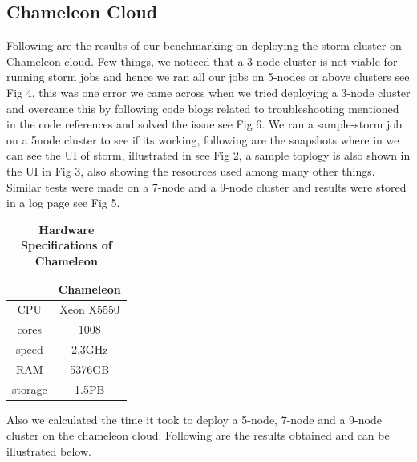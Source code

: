 \documentclass[9pt,twocolumn,twoside]{../../styles/osajnl}
\begin{document}
\subsection{Chameleon Cloud}
Following are the results of our benchmarking on deploying the storm
cluster on Chameleon cloud. Few things, we noticed that a 3-node
cluster is not viable for running storm jobs and hence we ran all our
jobs on 5-nodes or above clusters see Fig 4, this was one error we
came across when we tried deploying a 3-node cluster and overcame this
by following code blogs related to troubleshooting mentioned in the
code references and solved the issue see Fig 6. We ran a sample-storm job on a
5node cluster to see if its working, following are the snapshots where
in we can see the UI of storm, illustrated in see Fig 2, a sample
toplogy is also shown in the UI in Fig 3, also showing the resources
used among many other things. Similar tests were made on a 7-node and
a 9-node cluster and results were stored in a log page see Fig 5.



\begin{table}[htbp]
\centering
\caption{\bf Hardware Specifications of Chameleon}

 \begin{tabular} {| c | c |}
\hline
  & Chameleon   \\ [0.5ex] 
 \hline

    
CPU   & Xeon X5550  \\
 \hline
cores & 1008   \\
 \hline
speed & 2.3GHz \\
 \hline
RAM   & 5376GB  \\
 \hline
storage & 1.5PB  \\ [1ex] 
 \hline

\end{tabular}
  \label{tab:cloud-comparison}
\end{table}



Also we calculated the time it took to deploy a 5-node, 7-node and a 9-node cluster on the chameleon cloud. Following are the results obtained and can be illustrated below.


\begin{table}[htb]
\centering
\caption{TABLE CAPTION}\label{T:bench1}
\end{table}
\end{document}
